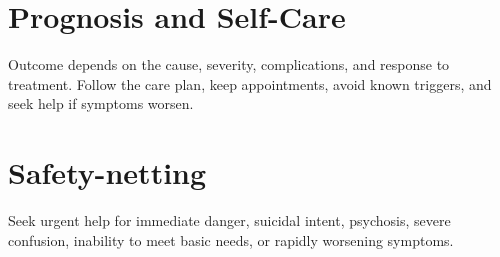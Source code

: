 \section*{Prognosis and Self-Care}
Outcome depends on the cause, severity, complications, and response to treatment. Follow the care plan, keep appointments, avoid known triggers, and seek help if symptoms worsen.
\section*{Safety-netting}
Seek urgent help for immediate danger, suicidal intent, psychosis, severe confusion, inability to meet basic needs, or rapidly worsening symptoms.
